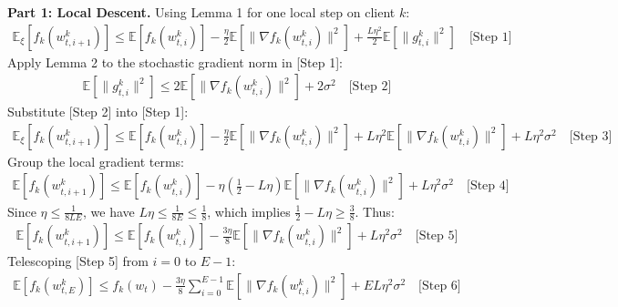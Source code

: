 \documentclass{article}
\begin{document}
\textbf{Part 1: Local Descent.} Using Lemma 1 for one local step on client $k$:
\begin{align}
\mathbb{E}_{\xi}[f_k(w_{t,i+1}^k)] \leq \mathbb{E}[f_k(w_{t,i}^k)] - \frac{\eta}{2} \mathbb{E}[\|\nabla f_k(w_{t,i}^k)\|^2] + \frac{L \eta^2}{2} \mathbb{E}[\|g_{t,i}^k\|^2] \quad \text{[Step 1]}
\end{align}
Apply Lemma 2 to the stochastic gradient norm in [Step 1]:
\begin{align}
\mathbb{E}[\|g_{t,i}^k\|^2] \leq 2 \mathbb{E}[\|\nabla f_k(w_{t,i}^k)\|^2] + 2\sigma^2 \quad \text{[Step 2]}
\end{align}
Substitute [Step 2] into [Step 1]:
\begin{align}
\mathbb{E}_{\xi}[f_k(w_{t,i+1}^k)] \leq \mathbb{E}[f_k(w_{t,i}^k)] - \frac{\eta}{2} \mathbb{E}[\|\nabla f_k(w_{t,i}^k)\|^2] + L \eta^2 \mathbb{E}[\|\nabla f_k(w_{t,i}^k)\|^2] + L \eta^2 \sigma^2 \quad \text{[Step 3]}
\end{align}
Group the local gradient terms:
\begin{align}
\mathbb{E}[f_k(w_{t,i+1}^k)] \leq \mathbb{E}[f_k(w_{t,i}^k)] - \eta \left( \frac{1}{2} - L \eta \right) \mathbb{E}[\|\nabla f_k(w_{t,i}^k)\|^2] + L \eta^2 \sigma^2 \quad \text{[Step 4]}
\end{align}
Since $\eta \leq \frac{1}{8LE}$, we have $L\eta \leq \frac{1}{8E} \leq \frac{1}{8}$, which implies $\frac{1}{2} - L\eta \geq \frac{3}{8}$. Thus:
\begin{align}
\mathbb{E}[f_k(w_{t,i+1}^k)] \leq \mathbb{E}[f_k(w_{t,i}^k)] - \frac{3\eta}{8} \mathbb{E}[\|\nabla f_k(w_{t,i}^k)\|^2] + L \eta^2 \sigma^2 \quad \text{[Step 5]}
\end{align}
Telescoping [Step 5] from $i=0$ to $E-1$:
\begin{align}
\mathbb{E}[f_k(w_{t,E}^k)] \leq f_k(w_t) - \frac{3\eta}{8} \sum_{i=0}^{E-1} \mathbb{E}[\|\nabla f_k(w_{t,i}^k)\|^2] + E L \eta^2 \sigma^2 \quad \text{[Step 6]}
\end{align}
\end{document}

